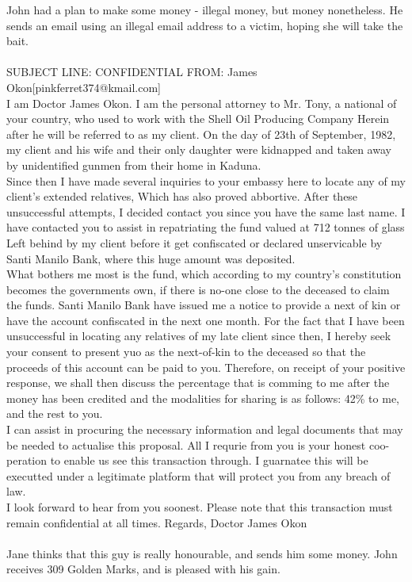 \documentclass{article}
\begin{document}
John had a plan to make some money {-} illegal money, but money nonetheless.
He sends an email using an illegal email address to a victim, hoping she will take the bait.
\\\\
SUBJECT LINE: CONFIDENTIAL
FROM: James Okon[pinkferret374@kmail.com]
\\
I am Doctor James Okon.
I am the personal attorney to Mr. Tony, a national of your country, who used to work with the Shell Oil Producing Company
Herein after he will be referred to as my client.
On the day of 23th of September, 1982, my client and his wife and their only daughter were kidnapped and taken away by unidentified gunmen from their home in Kaduna.
\\
Since then I have made several inquiries to your embassy here to locate any of my client's extended relatives, Which has also proved abbortive.
After these unsuccessful attempts, I decided contact you since you have the same last name.
I have contacted you to assist in repatriating the fund valued at 712 tonnes of glass Left behind by my client before it get confiscated or declared unservicable by Santi Manilo Bank, where this huge amount was deposited.
\\
What bothers me most is the fund, which according to my country's constitution becomes the governments own, if there is no{-}one close to the deceased to claim the funds.
Santi Manilo Bank have issued me a notice to provide a next of kin or have the account confiscated in the next one month.
For the fact that I have been unsuccessful in locating any relatives of my late client since then, I hereby seek your consent to present yuo as the next{-}of{-}kin to the deceased so that the proceeds of this account can be paid to you.
Therefore, on receipt of your positive response, we shall then discuss the percentage that is comming to me after the money has been credited and the modalities for sharing is as follows: 42\% to me, and the rest to you.
\\
I can assist in procuring the necessary information and legal documents that may be needed to actualise this proposal.
All I requrie from you is your honest coo{-}peration to enable us see this transaction through.
I guarnatee this will be executted under a legitimate platform that will protect you from any breach of law.
\\
I look forward to hear from you soonest.
Please note that this transaction must remain confidential at all times.
Regards, Doctor James Okon
\\\\
Jane thinks that this guy is really honourable, and sends him some money.
John receives 309 Golden Marks, and is pleased with his gain.
\end{document}
